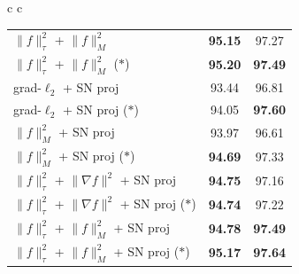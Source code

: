\begin{table}
\begin{tabular}{c c}
\begin{tabular}{ | l | c | c |  }
$\|f\|_{\tau}^2$ + $\|f\|^2_M$ & \textbf{95.15} & 97.27 \\
$\|f\|_{\tau}^2$ + $\|f\|^2_M$ ($\ast$) & \textbf{95.20} & \textbf{\color{darkgray}97.49} \\
grad-$\ell_2$ + SN proj & 93.44 & 96.81 \\
grad-$\ell_2$ + SN proj ($\ast$) & 94.05 & \textbf{97.60} \\
$\|f\|_M^2$ + SN proj & 93.97 & 96.61 \\
$\|f\|_M^2$ + SN proj ($\ast$) & \textbf{\color{darkgray}94.69} & 97.33 \\
$\|f\|_{\tau}^2$ + $\|\nabla f\|^2$ + SN proj & \textbf{\color{darkgray}94.75} & 97.16 \\
$\|f\|_{\tau}^2$ + $\|\nabla f\|^2$ + SN proj ($\ast$) & \textbf{\color{darkgray}94.74} & 97.22 \\
$\|f\|_{\tau}^2$ + $\|f\|^2_M$ + SN proj & \textbf{\color{darkgray}94.78} & \textbf{\color{darkgray}97.49} \\
$\|f\|_{\tau}^2$ + $\|f\|^2_M$ + SN proj ($\ast$) & \textbf{95.17} & \textbf{97.64} \\
\hline
\end{tabular}
\end{tabular}
\end{table}

